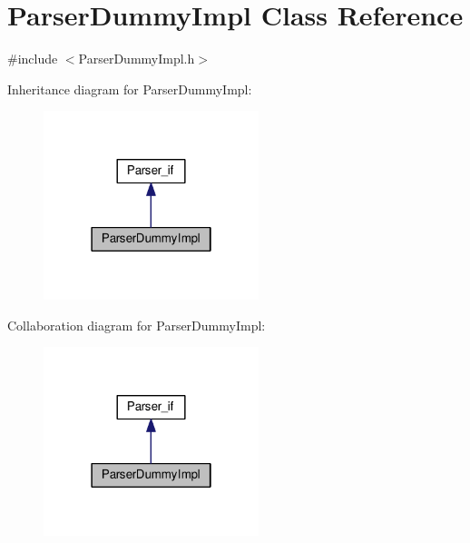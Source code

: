 \hypertarget{class_parser_dummy_impl}{}\section{Parser\+Dummy\+Impl Class Reference}
\label{class_parser_dummy_impl}


{\ttfamily \#include $<$Parser\+Dummy\+Impl.\+h$>$}



Inheritance diagram for Parser\+Dummy\+Impl\+:
\nopagebreak
\begin{figure}[H]
\begin{center}
\leavevmode
\includegraphics[width=178pt]{class_parser_dummy_impl__inherit__graph}
\end{center}
\end{figure}


Collaboration diagram for Parser\+Dummy\+Impl\+:
\nopagebreak
\begin{figure}[H]
\begin{center}
\leavevmode
\includegraphics[width=178pt]{class_parser_dummy_impl__coll__graph}
\end{center}
\end{figure}
